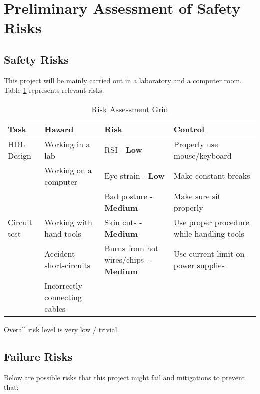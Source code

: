 \documentclass[a4paper,11pt]{article}
\begin{document}
\pagebreak
\section{Preliminary Assessment of Safety Risks}
\subsection{Safety Risks}

This project will be mainly carried out in a laboratory and a computer room. Table \ref{table:riskgrid} represents relevant risks.
\begin{table}[h!]
	\centering
	\begin{tabular}{| l | p{4cm} | p{5cm} | p{5cm} |} \hline
		 Task 		& Hazard 			& Risk 					& Control \\\hline
		HDL Design & Working in a lab 
		&	RSI - \textbf{Low}	& Properly use mouse/keyboard \\
		&	Working on a computer
		& 	Eye strain - \textbf{Low} & Make constant breaks\\
		&& 	Bad posture - \textbf{Medium} & Make sure sit properly\\\hline
		Circuit test & Working with hand tools 
		&	Skin cuts - \textbf{Medium}& Use proper procedure while handling tools\\
		& Accident short-circuits & Burns from hot wires/chips  - \textbf{Medium}& Use current limit on power supplies\\
		& Incorrectly connecting cables &&
		\\\hline
		
	\end{tabular}
	\caption{Risk Assessment Grid}
	\label{table:riskgrid}
\end{table}

Overall risk level is very low / trivial.
\subsection{Failure Risks}
Below are possible risks that this project might fail and mitigations to prevent that:
\end{document}
